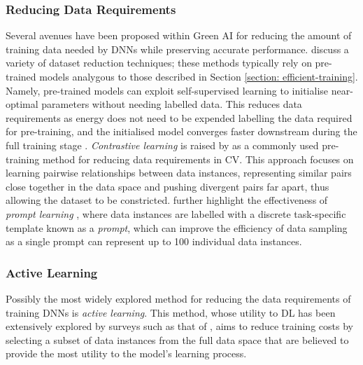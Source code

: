 \documentclass[a4paper, 11pt]{report}
\begin{document}
    \subsubsection{Reducing Data Requirements}

    Several avenues have been proposed within Green AI for reducing the amount of training data needed by DNNs while preserving accurate performance. \citet{xu-2021} discuss a variety of dataset reduction techniques; these methods typically rely on pre-trained models analygous to those described in Section \ref{section: efficient-training}. Namely, pre-trained models can exploit self-supervised learning to initialise near-optimal parameters without needing labelled data. This reduces data requirements as energy does not need to be expended labelling the data required for pre-training, and the initialised model converges faster downstream during the full training stage \citep{xu-2021}. \emph{Contrastive learning} \citep{chen-2020} is raised by \citet{xu-2021} as a commonly used pre-training method for reducing data requirements in CV. This approach focuses on learning pairwise relationships between data instances, representing similar pairs close together in the data space and pushing divergent pairs far apart, thus allowing the dataset to be constricted. \citet{xu-2021} further highlight the effectiveness of \emph{prompt learning} \citep{liu-2021}, where data instances are labelled with a discrete task-specific template known as a \emph{prompt}, which can improve the efficiency of data sampling as a single prompt can represent up to 100 individual data instances. 


    \subsubsection{Active Learning}
    \label{section: active-learning}

    Possibly the most widely explored method for reducing the data requirements of training DNNs is \emph{active learning}. This method, whose utility to DL has been extensively explored by surveys such as that of \citet{ren-2021}, aims to reduce training costs by selecting a subset of data instances from the full data space that are believed to provide the most utility to the model's learning process. 
\end{document}
